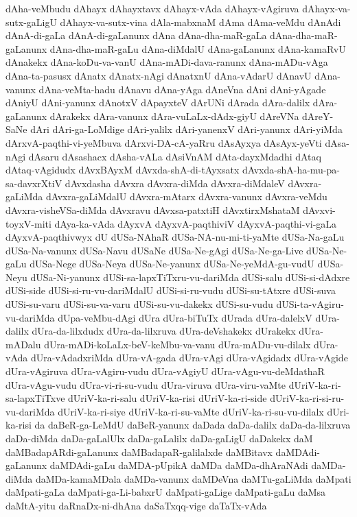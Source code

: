 {dAha-veMbudu
dAhayx
dAhayxtavx
dAhayx-vAda
dAhayx-vAgiruva
dAhayx-va-sutx-gaLigU
dAhayx-va-sutx-vina
dAla-mabxnaM
dAma
dAma-veMdu
dAnAdi
dAnA-di-gaLa
dAnA-di-gaLanunx
dAna
dAna-dha-maR-gaLa
dAna-dha-maR-gaLanunx
dAna-dha-maR-gaLu
dAna-diMdalU
dAna-gaLanunx
dAna-kamaRvU
dAnakekx
dAna-koDu-va-vanU
dAna-mADi-dava-ranunx
dAna-mADu-vAga
dAna-ta-pasusx
dAnatx
dAnatx-nAgi
dAnatxnU
dAna-vAdarU
dAnavU
dAna-vanunx
dAna-veMta-hadu
dAnavu
dAna-yAga
dAneVna
dAni
dAni-yAgade
dAniyU
dAni-yanunx
dAnotxV
dApayxteV
dArUNi
dArada
dAra-dalilx
dAra-gaLanunx
dArakekx
dAra-vanunx
dAra-vuLaLx-dAdx-giyU
dAreVNa
dAreY-SaNe
dAri
dAri-ga-LoMdige
dAri-yalilx
dAri-yanenxV
dAri-yanunx
dAri-yiMda
dArxvA-paqthi-vi-yeMbuva
dArxvi-DA-cA-yaRru
dAsAyxya
dAsAyx-yeVti
dAsa-nAgi
dAsaru
dAsashacx
dAsha-vALa
dAsiVnAM
dAta-dayxMdadhi
dAtaq
dAtaq-vAgidudx
dAvxBAyxM
dAvxda-shA-di-tAyxsatx
dAvxda-shA-ha-mu-pa-sa-davxrXtiV
dAvxdasha
dAvxra
dAvxra-diMda
dAvxra-diMdaleV
dAvxra-gaLiMda
dAvxra-gaLiMdalU
dAvxra-mAtarx
dAvxra-vanunx
dAvxra-veMdu
dAvxra-visheVSa-diMda
dAvxravu
dAvxsa-patxtiH
dAvxtirxMshataM
dAvxvi-toyxV-miti
dAya-ka-vAda
dAyxvA
dAyxvA-paqthiviV
dAyxvA-paqthi-vi-gaLa
dAyxvA-paqthivwyx
dU
dUSa-NAhaR
dUSa-NA-nu-mi-ti-yaMte
dUSa-Na-gaLu
dUSa-Na-vanunx
dUSa-Navu
dUSaNe
dUSa-Ne-gAgi
dUSa-Ne-ga-Live
dUSa-Ne-gaLu
dUSa-Nege
dUSa-Neya
dUSa-Ne-yanunx
dUSa-Ne-yeMdA-gu-vudU
dUSa-Neyu
dUSa-Ni-yanunx
dUSi-sa-lapxTiTxru-vu-dariMda
dUSi-salu
dUSi-si-dAdxre
dUSi-side
dUSi-si-ru-vu-dariMdalU
dUSi-si-ru-vudu
dUSi-su-tAtxre
dUSi-suva
dUSi-su-varu
dUSi-su-va-varu
dUSi-su-vu-dakekx
dUSi-su-vudu
dUSi-ta-vAgiru-vu-dariMda
dUpa-veMbu-dAgi
dUra
dUra-biTuTx
dUrada
dUra-dalelxV
dUra-dalilx
dUra-da-lilxdudx
dUra-da-lilxruva
dUra-deVshakekx
dUrakekx
dUra-mADalu
dUra-mADi-koLaLx-beV-keMbu-va-vanu
dUra-mADu-vu-dilalx
dUra-vAda
dUra-vAdadxriMda
dUra-vA-gada
dUra-vAgi
dUra-vAgidadx
dUra-vAgide
dUra-vAgiruva
dUra-vAgiru-vudu
dUra-vAgiyU
dUra-vAgu-vu-deMdathaR
dUra-vAgu-vudu
dUra-vi-ri-su-vudu
dUra-viruva
dUra-viru-vaMte
dUriV-ka-ri-sa-lapxTiTxve
dUriV-ka-ri-salu
dUriV-ka-risi
dUriV-ka-ri-side
dUriV-ka-ri-si-ru-vu-dariMda
dUriV-ka-ri-siye
dUriV-ka-ri-su-vaMte
dUriV-ka-ri-su-vu-dilalx
dUri-ka-risi
da
daBeR-ga-LeMdU
daBeR-yanunx
daDada
daDa-dalilx
daDa-da-lilxruva
daDa-diMda
daDa-gaLalUlx
daDa-gaLalilx
daDa-gaLigU
daDakekx
daM
daMBadapARdi-gaLanunx
daMBadapaR-galilalxde
daMBitavx
daMDAdi-gaLanunx
daMDAdi-gaLu
daMDA-pUpikA
daMDa
daMDa-dhAraNAdi
daMDa-diMda
daMDa-kamaMDala
daMDa-vanunx
daMDeVna
daMTu-gaLiMda
daMpati
daMpati-gaLa
daMpati-ga-Li-babxrU
daMpati-gaLige
daMpati-gaLu
daMsa
daMtA-yitu
daRnaDx-ni-dhAna
daSaTxqq-vige
daTaTx-vAda
}
